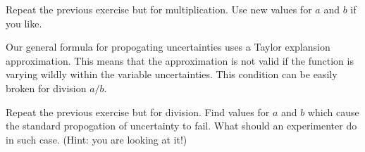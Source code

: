 \begin{plot}
Repeat the previous exercise but for multiplication.  Use new values
for $a$ and $b$ if you like.
\end{plot}

Our general formula for propogating uncertainties uses a Taylor
explansion approximation.  This means that the approximation is not
valid if the function is varying wildly within the variable
uncertainties.  This condition can be easily broken for division
$a/b$.

\begin{plot}
Repeat the previous exercise but for division.  Find values
for $a$ and $b$ which cause the standard propogation of uncertainty to fail.  What should an experimenter do in such case.  (Hint:  you are looking at it!)
\end{plot}




























